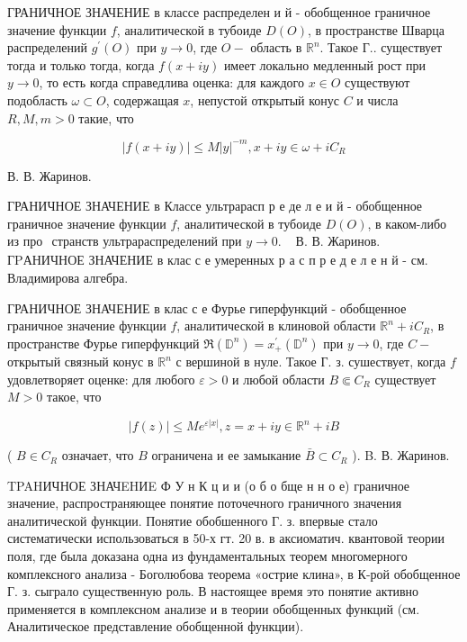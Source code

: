 \documentclass[10pt]{article}
\begin{document}
ГРАНИЧНОЕ ЗНАЧЕНИЕ в классе распределен и й - обобщенное граничное значение функции $f$, аналитической в тубоиде $D(O)$, в пространстве Шварца распределений $g^{\prime}(O)$ при $y \rightarrow 0$, где $O-$ область в $\mathbb{R}^{n}$. Такое $Г$.. существует тогда и только тогда, когда $f(x+i y)$ имеет локально медленный рост при $y \rightarrow 0$, то есть когда справедлива оценка: для каждого $x \in O$ существуют подобласть $\omega \subset O$, содержащая $x$, непустой открытый конус $C$ и числа $R, M, m>0$ такие, что



\[

|f(x+i y)| \leqslant M|y|^{-m}, x+i y \in \omega+i C_{R}

\]



В. В. Жаринов.



ГРАНИЧНОЕ ЗНАЧЕНИЕ в Классе ультрарасп р е де л е и й - обобщенное граничное значение функции $f$, аналитической в тубоиде $D(O)$, в каком-либо из про$\begin{array}{ll}\text { странств ультрараспределений при } y \rightarrow 0 . & \text { В. В. Жаринов. }\end{array}$ ГPАНИЧНОЕ ЗНАЧЕНИЕ в клас с е умеренных р а с п р е д е л е н й - см. Владимирова алгебра.



ГРАНИЧНОЕ ЗНАЧЕНИЕ в клас с е Фурье гиперфункций - обобщенное граничное значение функции $f$, аналитической в клиновой области $\mathbb{R}^{n}+i C_{R}$, в пространстве Фурье гиперфункций $\Re\left(\mathbb{D}^{n}\right)=x_{+}^{\prime}\left(\mathbb{D}^{n}\right)$ при $y \rightarrow 0$, где $C-$ открытый связный конус в $\mathbb{R}^{n}$ с вершиной в нуле. Такое Г. з. сушествует, когда $f$ удовлетворяет оценке: для любого $\varepsilon>0$ и любой области $B \Subset C_{R}$ существует $M>0$ такое, что



\[

|f(z)| \leqslant M e^{\varepsilon|x|}, z=x+i y \in \mathbb{R}^{n}+i B

\]



( $B \in C_{R}$ означает, что $B$ ограничена и ее замыкание $\bar{B} \subset C_{R}$ ). B. В. Жаринов.



TPAHИЧНОЕ ЗНАЧEHИE Ф У н К ц и и (о б о бще н н о е) граничное значение, распространяющее понятие поточечного граничного значения аналитической функции. Понятие обобшенного Г. з. впервые стало систематически использоваться в 50-х гт. 20 в. в аксиоматич. квантовой теории поля, где была доказана одна из фундаментальных теорем многомерного комплексного анализа - Боголюбова теорема «острие клина», в К-рой обобщенное Г. з. сыграло существенную роль. В настоящее время это понятие активно применяется в комплексном анализе и в теории обобщенных функций (см. Аналитическое представление обобщенной функции).
\end{document}
